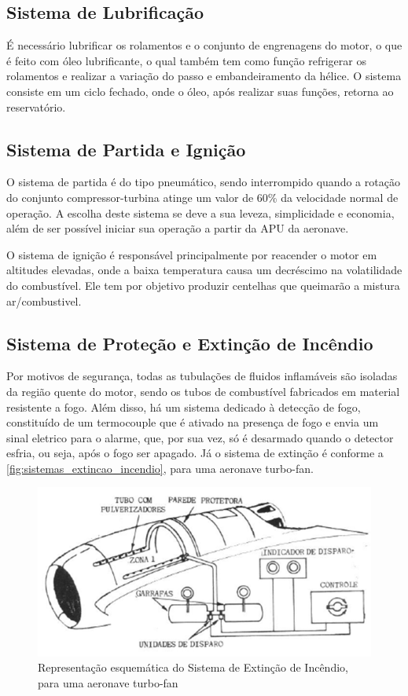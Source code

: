 \subsection{Sistema de Lubrificação}

É necessário lubrificar os rolamentos e o conjunto de engrenagens do motor, o que é feito com óleo lubrificante, o qual também tem como função refrigerar os rolamentos e realizar a variação do passo e embandeiramento da hélice.
O sistema consiste em um ciclo fechado, onde o óleo, após realizar suas funções, retorna ao reservatório.

\subsection{Sistema de Partida e Ignição}

O sistema de partida é do tipo pneumático, sendo interrompido quando a rotação do conjunto compressor-turbina atinge um valor de 60\% da velocidade normal de operação.
A escolha deste sistema se deve a sua leveza, simplicidade e economia, além de ser possível iniciar sua operação a partir da APU da aeronave.

O sistema de ignição é responsável principalmente por reacender o motor em altitudes elevadas, onde a baixa temperatura causa um decréscimo na volatilidade do combustível.
Ele tem por objetivo produzir centelhas que queimarão a mistura ar/combustivel.

\subsection{Sistema de Proteção e Extinção de Incêndio}

Por motivos de segurança, todas as tubulações de fluidos inflamáveis são isoladas da região quente do motor, sendo os tubos de combustível fabricados em material resistente a fogo.
Além disso, há um sistema dedicado à detecção de fogo, constituído de um termocouple que é ativado na presença de fogo e envia um sinal eletrico para o alarme, que, por sua vez, só é desarmado quando o detector esfria, ou seja, após o fogo ser apagado.
Já o sistema de extinção é conforme a \autoref{fig:sistemas_extincao_incendio}, para uma aeronave turbo-fan.

\begin{figure}
\centering
\includegraphics[width=\textwidth]{images/parte3/sistemas_extincao_incendio.png}
\caption{Representação esquemática do Sistema de Extinção de Incêndio, para uma aeronave turbo-fan}
\label{fig:sistemas_extincao_incendio}
\end{figure}


